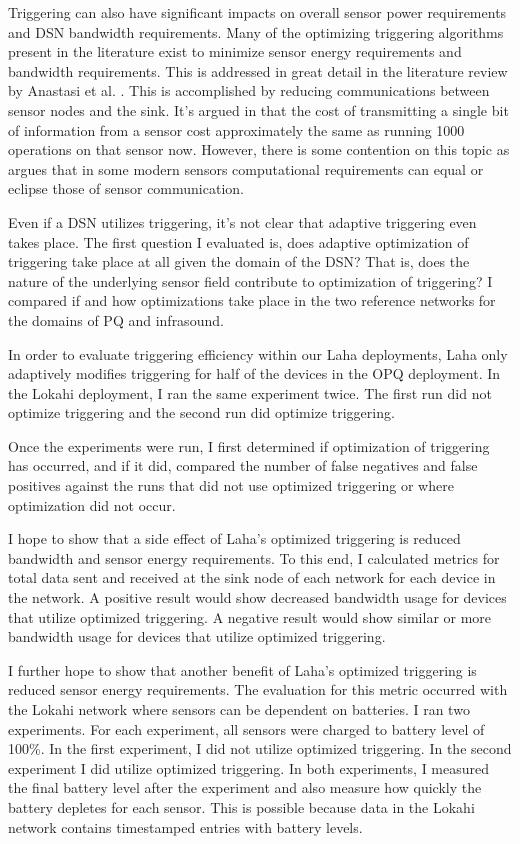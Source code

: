 Triggering can also have significant impacts on overall sensor power requirements and DSN bandwidth requirements. Many of the optimizing triggering algorithms present in the literature exist to minimize sensor energy requirements and bandwidth requirements. This is addressed in great detail in the literature review by Anastasi et al. \cite{anastasi_energy_2009}. This is accomplished by reducing communications between sensor nodes and the sink. It's argued in \cite{pottie2000wireless} that the cost of transmitting a single bit of information from a sensor cost approximately the same as running 1000 operations on that sensor now. However, there is some contention on this topic as \cite{alippi_adaptive_2010} argues that in some modern sensors computational requirements can equal or eclipse those of  sensor communication.  

Even if a DSN utilizes triggering, it's not clear that adaptive triggering even takes place. The first question I evaluated is, does adaptive optimization of triggering take place at all given the domain of the DSN? That is, does the nature of the underlying sensor field contribute to optimization of triggering? I compared if and how optimizations take place in the two reference networks for the domains of PQ and infrasound.

In order to evaluate triggering efficiency within our Laha deployments, Laha only adaptively modifies triggering for half of the devices in the OPQ deployment. In the Lokahi deployment, I  ran the same experiment twice. The first run did not optimize triggering and the second run did optimize triggering.

Once the experiments were run, I first determined if optimization of triggering has occurred, and if it did, compared the number of false negatives and false positives against the runs that did not use optimized triggering or where optimization did not occur. 

I hope to show that a side effect of Laha's optimized triggering is reduced bandwidth and sensor energy requirements. To this end, I calculated metrics for total data sent and received at the sink node of each network for each device in the network. A positive result would show decreased bandwidth usage for devices that utilize optimized triggering. A negative result would show similar or more bandwidth usage for devices that utilize optimized triggering.

I further hope to show that another benefit of Laha's optimized triggering is reduced sensor energy requirements. The evaluation for this metric occurred with the Lokahi network where sensors can be dependent on batteries. I ran two experiments. For each experiment, all sensors were charged to battery level of 100\%. In the first experiment, I did not utilize optimized triggering. In the second experiment I did utilize optimized triggering. In both experiments, I measured the final battery level after the experiment and also measure how quickly the battery depletes for each sensor. This is possible because data in the Lokahi network contains timestamped entries with battery levels.

